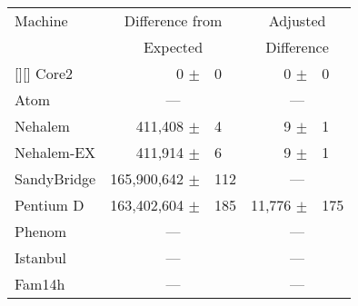 \begin{tabular}{|l||rl|rl|}

\hline

Machine   & \multicolumn{2}{c|}{Difference from} & \multicolumn{2}{c|}{Adjusted} \\
          & \multicolumn{2}{c|}{Expected}        & \multicolumn{2}{c|}{Difference} \\

\hline
\hline
\rowcolor{yellow}[\tabcolsep][\tabcolsep]
Core2          &    0 $\pm$ &0                  &        0 $\pm$ &0 \\
\hline
Atom           & \multicolumn{2}{c|}{---}  &  \multicolumn{2}{c|}{---} \\
\hline
Nehalem        & 411,408 $\pm$ &4               &    9 $\pm$ &1 \\
\hline
Nehalem-EX     & 411,914 $\pm$ &6               &    9 $\pm$ &1 \\
\hline
SandyBridge    & 165,900,642 $\pm$ &112         &   \multicolumn{2}{c|}{---} \\
\hline
Pentium D      & 163,402,604 $\pm$ & 185         &  11,776  $\pm$ &175     \\
\hline
Phenom         &  \multicolumn{2}{c|}{---} &  \multicolumn{2}{c|}{---} \\
\hline
Istanbul       &  \multicolumn{2}{c|}{---} &  \multicolumn{2}{c|}{---} \\
\hline
Fam14h         &  \multicolumn{2}{c|}{---} &  \multicolumn{2}{c|}{---} \\
\hline
\end{tabular}

